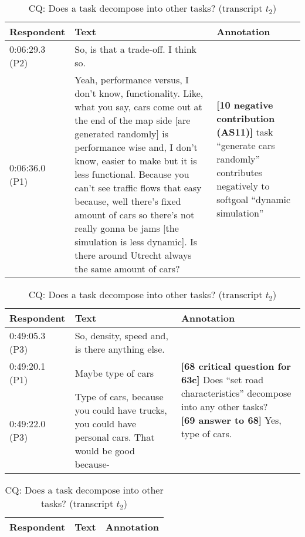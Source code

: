\begin{table}[!htbp]
\begin{tabular}{|p{20mm}|p{100mm}|p{30mm}|}
\hline
Respondent & Text & Annotation\\
\hline
0:06:29.3 (P2) & So, is that a trade-off. I think so. &\multirow{2}{30mm}{\textbf{[10 negative contribution (AS11)]}  task ``generate cars randomly'' contributes negatively to softgoal ``dynamic simulation''}\\	
\cline{1-2}
0:06:36.0 (P1) & Yeah, performance versus, I don't know, functionality. Like, what you say, cars come out at the end of the map side [are generated randomly] is performance wise and, I don't know, easier to make but it is less functional. Because you can't see traffic flows that easy because, well there's fixed amount of cars so there's not really gonna be jams [the simulation is less dynamic]. Is there around Utrecht always the same amount of cars? &\\
\hline	
\end{tabular}
\caption{AS11: Negative decomposition (transcript $t_1$)}
\label{table:transcript:as11}

\begin{tabular}{|p{20mm}|p{80mm}|p{50mm}|}
\hline
Respondent & Text & Annotation\\
\hline
0:49:05.3 (P3)&So, density, speed and, is there anything else.&\multirow{3}{50mm}{\textbf{[68 critical question for 63c]} Does ``set road characteristics'' decompose into any other tasks?\newline
\textbf{[69 answer to 68]} Yes, type of cars.}\\
\cline{1-2}
0:49:20.1 (P1) & Maybe type of cars&\\	
\cline{1-2}
0:49:22.0 (P3) & Type of cars, because you could have trucks, you could have personal cars. That would be good because-&\\
\hline	
\end{tabular}
\caption{CQ: Does a task decompose into other tasks? (transcript $t_2$)}
\label{table:transcript:cq:task_decomp}

\begin{tabular}{|p{20mm}|p{60mm}|p{70mm}|}
\hline
Respondent & Text & Annotation\\
\hline


\end{tabular}
\end{table}
